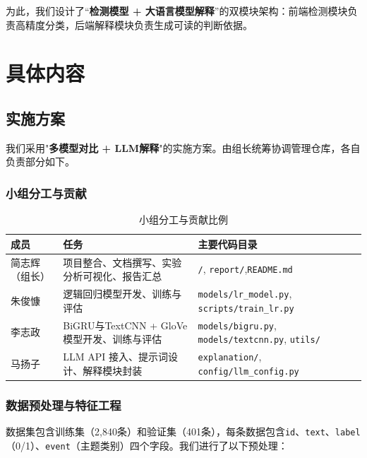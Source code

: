 \documentclass[12pt,a4paper]{article}
\begin{document}
为此，我们设计了“\textbf{检测模型 + 大语言模型解释}”的双模块架构：前端检测模块负责高精度分类，后端解释模块负责生成可读的判断依据。

\section{具体内容}

\subsection{实施方案}

我们采用"\textbf{多模型对比 + LLM解释}"的实施方案。由组长统筹协调管理仓库，各自负责部分如下。

\subsubsection{小组分工与贡献}

\begin{table}[H]
    \centering
    \caption{小组分工与贡献比例}
    \label{tab:division}
    \begin{tabular}{p{2.2cm}p{6cm}p{2.5cm}p{2.5cm}}
        \toprule
        \textbf{成员} & \textbf{任务} & \textbf{主要代码目录}\\
        \midrule
        简志辉（组长） & 项目整合、文档撰写、实验分析可视化、报告汇总 & \texttt{/}, \texttt{report/},\texttt{README.md} \\
        \addlinespace
        朱俊慷 & 逻辑回归模型开发、训练与评估 & \texttt{models/lr\_model.py}, \texttt{scripts/train\_lr.py} \\
        \addlinespace
        李志政 & BiGRU与TextCNN + GloVe模型开发、训练与评估 & \texttt{models/bigru.py}, \texttt{models/textcnn.py}, \texttt{utils/} \\
        \addlinespace
        马扬子 & LLM API 接入、提示词设计、解释模块封装 & \texttt{explanation/}, \texttt{config/llm\_config.py} \\
        \bottomrule
    \end{tabular}
\end{table}

\subsubsection{数据预处理与特征工程}

数据集包含训练集（2,840条）和验证集（401条），每条数据包含\texttt{id}、\texttt{text}、\texttt{label}（0/1）、\texttt{event}（主题类别）四个字段。我们进行了以下预处理：
\end{document}
